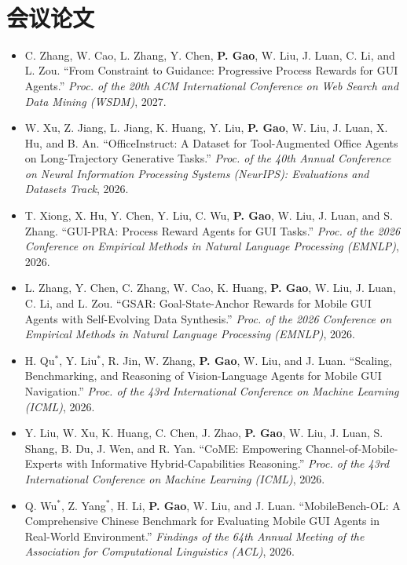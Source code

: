 \documentclass{resume}
\begin{document}
\

\section{会议论文}

\begin{itemize}[parsep=0.2ex]

\item {C. Zhang, W. Cao, L. Zhang, Y. Chen, {\bf P. Gao}, W. Liu, J. Luan, C. Li, and L. Zou. ``From Constraint to Guidance: Progressive Process Rewards for GUI Agents.'' \emph{Proc. of the 20th ACM International Conference on Web Search and Data Mining (WSDM)}, 2027.}

\item {W. Xu, Z. Jiang, L. Jiang, K. Huang, Y. Liu, {\bf P. Gao}, W. Liu, J. Luan, X. Hu, and B. An. ``OfficeInstruct: A Dataset for Tool-Augmented Office Agents on Long-Trajectory Generative Tasks.'' \emph{Proc. of the 40th Annual Conference on Neural Information Processing Systems (NeurIPS): Evaluations and Datasets Track}, 2026.}

\item {T. Xiong, X. Hu, Y. Chen, Y. Liu, C. Wu, {\bf P. Gao}, W. Liu, J. Luan, and S. Zhang. ``GUI-PRA: Process Reward Agents for GUI Tasks.'' \emph{Proc. of the 2026 Conference on Empirical Methods in Natural Language Processing (EMNLP)}, 2026.}

\item {L. Zhang, Y. Chen, C. Zhang, W. Cao, K. Huang, {\bf P. Gao}, W. Liu, J. Luan, C. Li, and L. Zou. ``GSAR: Goal-State-Anchor Rewards for Mobile GUI Agents with Self-Evolving Data Synthesis.'' \emph{Proc. of the 2026 Conference on Empirical Methods in Natural Language Processing (EMNLP)}, 2026.}

\item {H. Qu$^*$, Y. Liu$^*$, R. Jin, W. Zhang, {\bf P. Gao}, W. Liu, and J. Luan. ``Scaling, Benchmarking, and Reasoning of Vision-Language Agents for Mobile GUI Navigation.'' \emph{Proc. of the 43rd International Conference on Machine Learning (ICML)}, 2026.}

\item {Y. Liu, W. Xu, K. Huang, C. Chen, J. Zhao, {\bf P. Gao}, W. Liu, J. Luan, S. Shang, B. Du, J. Wen, and R. Yan. ``CoME: Empowering Channel-of-Mobile-Experts with Informative Hybrid-Capabilities Reasoning.'' \emph{Proc. of the 43rd International Conference on Machine Learning (ICML)}, 2026.}

\item {Q. Wu$^*$, Z. Yang$^*$, H. Li, {\bf P. Gao}, W. Liu, and J. Luan. ``MobileBench-OL: A Comprehensive Chinese Benchmark for Evaluating Mobile GUI Agents in Real-World Environment.'' \emph{Findings of the 64th Annual Meeting of the Association for Computational Linguistics (ACL)}, 2026.}


\end{itemize}
\end{document}
